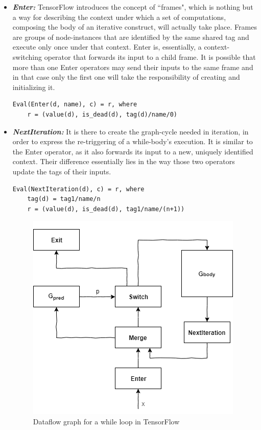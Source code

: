 \documentclass[ack,preface]{dithesis}
\begin{document}
    \begin{itemize}

    \item \textit{\textbf{Enter:}} TensorFlow introduces the concept of ``frames", which is nothing but a way for describing the context under which a set of computations, composing the body of an iterative construct, will actually take place. Frames are groups of node-instances that are identified by the same shared tag and execute only once under that context. Enter is, essentially, a context-switching operator that forwards its input to a child frame. It is possible that more than one Enter operators may send their inputs to the same frame and in that case only the first one will take the responsibility of creating and initializing it.
\begin{lstlisting}
Eval(Enter(d, name), c) = r, where
	r = (value(d), is_dead(d), tag(d)/name/0)
\end{lstlisting}

    \item \textit{\textbf{NextIteration:}} It is there to create the graph-cycle needed in iteration, in order to express the re-triggering of a while-body's execution. It is similar to the Enter operator, as it also forwards its input to a new, uniquely identified context. Their difference essentially lies in the way those two operators update the tags of their inputs.
\begin{lstlisting}
Eval(NextIteration(d), c) = r, where
	tag(d) = tag1/name/n
	r = (value(d), is_dead(d), tag1/name/(n+1))
\end{lstlisting}

\begin{figure}
\centering
\includegraphics[scale=0.5]{figures/while}
\caption{ Dataflow graph for a while loop in TensorFlow}
\end{figure}


\end{itemize}
\end{document}
